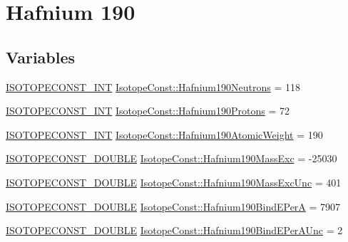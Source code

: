 \hypertarget{group___isotope_const-_hafnium-_hf190}{}\section{Hafnium 190}
\label{group___isotope_const-_hafnium-_hf190}
\subsection*{Variables}
\begin{DoxyCompactItemize}
\item 
\mbox{\hyperlink{group___isotope_const-_macros_ga5f18360b3e99483a35c32d789e62621c}{I\+S\+O\+T\+O\+P\+E\+C\+O\+N\+S\+T\+\_\+\+I\+NT}} \mbox{\hyperlink{group___isotope_const-_hafnium-_hf190_ga0aeb2be44ac81eca2ac973290fe6631b}{Isotope\+Const\+::\+Hafnium190\+Neutrons}} = 118
\item 
\mbox{\hyperlink{group___isotope_const-_macros_ga5f18360b3e99483a35c32d789e62621c}{I\+S\+O\+T\+O\+P\+E\+C\+O\+N\+S\+T\+\_\+\+I\+NT}} \mbox{\hyperlink{group___isotope_const-_hafnium-_hf190_gaa5ee5bdad1617a0aa6bb0a4472e33e61}{Isotope\+Const\+::\+Hafnium190\+Protons}} = 72
\item 
\mbox{\hyperlink{group___isotope_const-_macros_ga5f18360b3e99483a35c32d789e62621c}{I\+S\+O\+T\+O\+P\+E\+C\+O\+N\+S\+T\+\_\+\+I\+NT}} \mbox{\hyperlink{group___isotope_const-_hafnium-_hf190_ga76d79fe39134830cec64a6c9545d8585}{Isotope\+Const\+::\+Hafnium190\+Atomic\+Weight}} = 190
\item 
\mbox{\hyperlink{group___isotope_const-_macros_ga8f45a7272ce02c0b4c65c44636ed719a}{I\+S\+O\+T\+O\+P\+E\+C\+O\+N\+S\+T\+\_\+\+D\+O\+U\+B\+LE}} \mbox{\hyperlink{group___isotope_const-_hafnium-_hf190_gad6281c82915b50b039f58543da126bbc}{Isotope\+Const\+::\+Hafnium190\+Mass\+Exc}} = -\/25030
\item 
\mbox{\hyperlink{group___isotope_const-_macros_ga8f45a7272ce02c0b4c65c44636ed719a}{I\+S\+O\+T\+O\+P\+E\+C\+O\+N\+S\+T\+\_\+\+D\+O\+U\+B\+LE}} \mbox{\hyperlink{group___isotope_const-_hafnium-_hf190_ga2252e6c9233f94d0a99bd22c3f125dd4}{Isotope\+Const\+::\+Hafnium190\+Mass\+Exc\+Unc}} = 401
\item 
\mbox{\hyperlink{group___isotope_const-_macros_ga8f45a7272ce02c0b4c65c44636ed719a}{I\+S\+O\+T\+O\+P\+E\+C\+O\+N\+S\+T\+\_\+\+D\+O\+U\+B\+LE}} \mbox{\hyperlink{group___isotope_const-_hafnium-_hf190_gac3622d8f2f23adc5de850f6047ea622a}{Isotope\+Const\+::\+Hafnium190\+Bind\+E\+PerA}} = 7907
\item 
\mbox{\hyperlink{group___isotope_const-_macros_ga8f45a7272ce02c0b4c65c44636ed719a}{I\+S\+O\+T\+O\+P\+E\+C\+O\+N\+S\+T\+\_\+\+D\+O\+U\+B\+LE}} \mbox{\hyperlink{group___isotope_const-_hafnium-_hf190_ga937ca7b67e3bef2390268b49b4f6c940}{Isotope\+Const\+::\+Hafnium190\+Bind\+E\+Per\+A\+Unc}} = 2

\end{DoxyCompactItemize}
